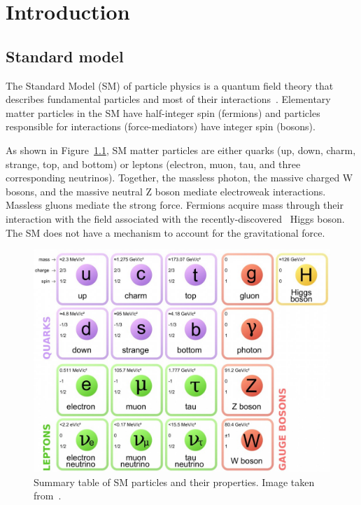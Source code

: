 \chapter{Introduction}


\section{Standard model}

The Standard Model (SM) of particle physics is a
quantum field theory that describes fundamental particles and most of their
interactions~\cite{THEORY:Glashow1961tr,THEORY:Weinberg1967tq,THEORY:Salam1968rm}.
Elementary matter particles in the SM have half-integer spin
(fermions) and particles responsible for interactions (force-mediators) have
integer spin (bosons).

As shown in Figure~\ref{fig:smtable}, SM matter particles are either quarks
(up, down, charm, strange, top, and bottom) or leptons (electron, muon, tau,
and three corresponding neutrinos). Together, the massless photon, the massive charged W bosons, and the massive neutral Z
boson mediate electroweak interactions. Massless gluons mediate the
strong force. Fermions acquire mass through their interaction with the field
associated with the
recently-discovered~\cite{CMS:HiggsObservation,ATLAS:HiggsObservation} Higgs
boson. The SM does not have a mechanism to account for the gravitational
force.


\begin{figure}[!htbp]
    \centering
    \includegraphics[width=0.75\linewidth]{figs/misc/smtable.jpg}
    \caption{
        Summary table of SM particles and their properties.
        Image taken from~\cite{THEORY:SMtableimg}.
    }
    \label{fig:smtable}
\end{figure}

